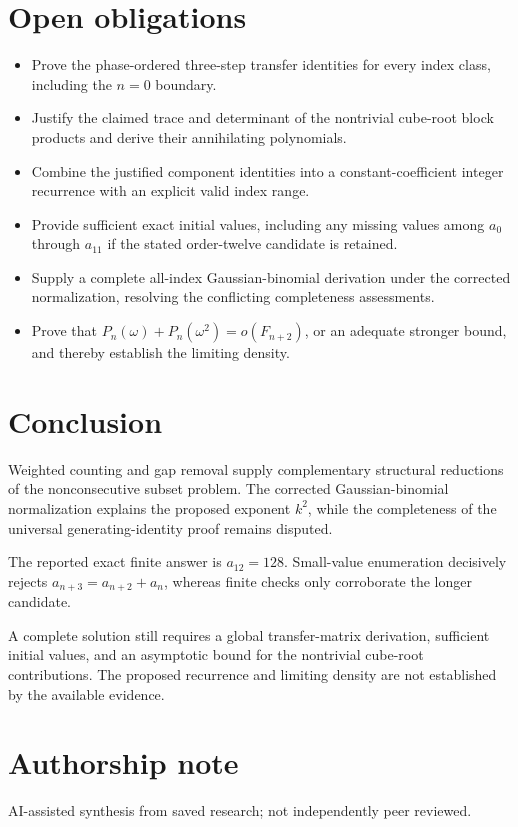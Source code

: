 \documentclass[11pt]{article}
\begin{document}
\section{Open obligations}
\begin{itemize}
\item Prove the phase-ordered three-step transfer identities for every index class, including the $n=0$ boundary.
\item Justify the claimed trace and determinant of the nontrivial cube-root block products and derive their annihilating polynomials.
\item Combine the justified component identities into a constant-coefficient integer recurrence with an explicit valid index range.
\item Provide sufficient exact initial values, including any missing values among $a_0$ through $a_{11}$ if the stated order-twelve candidate is retained.
\item Supply a complete all-index Gaussian-binomial derivation under the corrected normalization, resolving the conflicting completeness assessments.
\item Prove that $P_n(\omega)+P_n(\omega^2)=o(F_{n+2})$, or an adequate stronger bound, and thereby establish the limiting density.
\end{itemize}
\section{Conclusion}
Weighted counting and gap removal supply complementary structural reductions of the nonconsecutive subset problem. The corrected Gaussian-binomial normalization explains the proposed exponent $k^2$, while the completeness of the universal generating-identity proof remains disputed.

The reported exact finite answer is $a_{12}=128$. Small-value enumeration decisively rejects $a_{n+3}=a_{n+2}+a_n$, whereas finite checks only corroborate the longer candidate.

A complete solution still requires a global transfer-matrix derivation, sufficient initial values, and an asymptotic bound for the nontrivial cube-root contributions. The proposed recurrence and limiting density are not established by the available evidence.

\section*{Authorship note}
AI-assisted synthesis from saved research; not independently peer reviewed.
\end{document}

